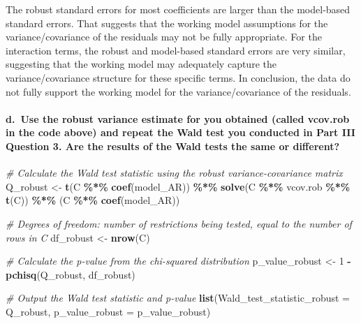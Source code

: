 \documentclass[
]{article}
\newenvironment{Shaded}{\begin{snugshade}}{\end{snugshade}}
\newcommand{\AttributeTok}[1]{\textcolor[rgb]{0.13,0.29,0.53}{#1}}
\newcommand{\CommentTok}[1]{\textcolor[rgb]{0.56,0.35,0.01}{\textit{#1}}}
\newcommand{\DecValTok}[1]{\textcolor[rgb]{0.00,0.00,0.81}{#1}}
\newcommand{\FunctionTok}[1]{\textcolor[rgb]{0.13,0.29,0.53}{\textbf{#1}}}
\newcommand{\NormalTok}[1]{#1}
\newcommand{\OtherTok}[1]{\textcolor[rgb]{0.56,0.35,0.01}{#1}}
\newcommand{\SpecialCharTok}[1]{\textcolor[rgb]{0.81,0.36,0.00}{\textbf{#1}}}
\begin{document}
The robust standard errors for most coefficients are larger than the
model-based standard errors. That suggests that the working model
assumptions for the variance/covariance of the residuals may not be
fully appropriate. For the interaction terms, the robust and model-based
standard errors are very similar, suggesting that the working model may
adequately capture the variance/covariance structure for these specific
terms. In conclusion, the data do not fully support the working model
for the variance/covariance of the residuals.

\hypertarget{d.-use-the-robust-variance-estimate-for-you-obtained-called-vcov.rob-in-the-code-above-and-repeat-the-wald-test-you-conducted-in-part-iii-question-3.-are-the-results-of-the-wald-tests-the-same-or-different}{%
\paragraph{d.~Use the robust variance estimate for you obtained (called
vcov.rob in the code above) and repeat the Wald test you conducted in
Part III Question 3. Are the results of the Wald tests the same or
different?}\label{d.-use-the-robust-variance-estimate-for-you-obtained-called-vcov.rob-in-the-code-above-and-repeat-the-wald-test-you-conducted-in-part-iii-question-3.-are-the-results-of-the-wald-tests-the-same-or-different}}

\begin{Shaded}
\begin{Highlighting}[]
\CommentTok{\# Calculate the Wald test statistic using the robust variance{-}covariance matrix}
\NormalTok{Q\_robust }\OtherTok{\textless{}{-}} \FunctionTok{t}\NormalTok{(C }\SpecialCharTok{\%*\%} \FunctionTok{coef}\NormalTok{(model\_AR)) }\SpecialCharTok{\%*\%} \FunctionTok{solve}\NormalTok{(C }\SpecialCharTok{\%*\%}\NormalTok{ vcov.rob }\SpecialCharTok{\%*\%} \FunctionTok{t}\NormalTok{(C)) }\SpecialCharTok{\%*\%}\NormalTok{ (C }\SpecialCharTok{\%*\%} \FunctionTok{coef}\NormalTok{(model\_AR))}

\CommentTok{\# Degrees of freedom: number of restrictions being tested, equal to the number of rows in C}
\NormalTok{df\_robust }\OtherTok{\textless{}{-}} \FunctionTok{nrow}\NormalTok{(C)}

\CommentTok{\# Calculate the p{-}value from the chi{-}squared distribution}
\NormalTok{p\_value\_robust }\OtherTok{\textless{}{-}} \DecValTok{1} \SpecialCharTok{{-}} \FunctionTok{pchisq}\NormalTok{(Q\_robust, df\_robust)}

\CommentTok{\# Output the Wald test statistic and p{-}value}
\FunctionTok{list}\NormalTok{(}\AttributeTok{Wald\_test\_statistic\_robust =}\NormalTok{ Q\_robust, }\AttributeTok{p\_value\_robust =}\NormalTok{ p\_value\_robust)}
\end{Highlighting}
\end{Shaded}
\end{document}
